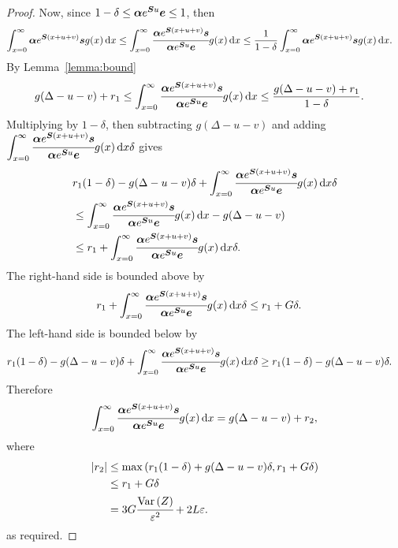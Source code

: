 \begin{proof}
	Now, since \(1-\delta\leq\boldsymbol \alpha e^{\boldsymbol Su}\boldsymbol e\leq 1\), then
	\begin{align*}
		\int_{x=0}^\infty \boldsymbol \alpha  e^{\boldsymbol{S} (x+u+v)} \boldsymbol s g(x)\, \mathrm{d} x
		\leq \int_{x=0}^\infty \cfrac{\boldsymbol \alpha  e^{\boldsymbol{S} (x+u+v)} \boldsymbol s}{\boldsymbol \alpha  e^{\boldsymbol{S} u} \boldsymbol e} g(x)\, \mathrm{d} x
		&\leq \frac{1}{1-\delta }\int_{x=0}^\infty \boldsymbol \alpha  e^{\boldsymbol{S} (x+u+v)} \boldsymbol s g(x)\, \mathrm{d} x.
	\end{align*}
	By Lemma~\ref{lemma:bound}  
	\begin{align*}
		g(\Delta-u-v)+r _1
		&\leq \int_{x=0}^\infty \cfrac{\boldsymbol \alpha  e^{\boldsymbol{S} (x+u+v)} \boldsymbol s}{\boldsymbol \alpha  e^{\boldsymbol{S} u} \boldsymbol e} g(x)\, \mathrm{d} x
		\leq \frac{g(\Delta-u-v)+r _1}{1-\delta }. 
	\end{align*}
	Multiplying by \(1-\delta \), then subtracting \(g(\Delta-u-v)\) and adding \(\displaystyle\int_{x=0}^\infty \cfrac{\boldsymbol \alpha  e^{\boldsymbol{S} (x+u+v)} \boldsymbol s}{\boldsymbol \alpha  e^{\boldsymbol{S} u} \boldsymbol e} g(x)\, \mathrm{d} x\delta \) gives
	\begin{align*}
		&r _1(1-\delta ) - g(\Delta-u-v)\delta +\int_{x=0}^\infty \cfrac{\boldsymbol \alpha  e^{\boldsymbol{S} (x+u+v)} \boldsymbol s}{\boldsymbol \alpha  e^{\boldsymbol{S} u} \boldsymbol e} g(x)\, \mathrm{d} x\delta 
		\\&\leq \int_{x=0}^\infty \cfrac{\boldsymbol \alpha  e^{\boldsymbol{S} (x+u+v)} \boldsymbol s}{\boldsymbol \alpha  e^{\boldsymbol{S} u} \boldsymbol e} g(x)\, \mathrm{d} x -g(\Delta-u-v)
		\\&\leq r _1+\int_{x=0}^\infty \cfrac{\boldsymbol \alpha  e^{\boldsymbol{S} (x+u+v)} \boldsymbol s}{\boldsymbol \alpha  e^{\boldsymbol{S} u} \boldsymbol e} g(x)\, \mathrm{d} x\delta .
	\end{align*}
	The right-hand side is bounded above by 
	\begin{align*}
		r _1+\int_{x=0}^\infty \cfrac{\boldsymbol \alpha  e^{\boldsymbol{S} (x+u+v)} \boldsymbol s}{\boldsymbol \alpha  e^{\boldsymbol{S} u} \boldsymbol e} g(x)\, \mathrm{d} x\delta 
		&\leq r _1 + G \delta .
	\end{align*}
	The left-hand side is bounded below by 
	\begin{align*}
		r_1 (1-\delta ) - g(\Delta-u-v)\delta +\int_{x=0}^\infty \cfrac{\boldsymbol \alpha  e^{\boldsymbol{S} (x+u+v)} \boldsymbol s}{\boldsymbol \alpha  e^{\boldsymbol{S} u} \boldsymbol e} g(x)\, \mathrm{d} x\delta 
		&\geq r _1(1-\delta ) - g(\Delta-u-v)\delta .
	\end{align*}
	Therefore 
	\begin{align}
		\int_{x=0}^\infty \cfrac{\boldsymbol \alpha  e^{\boldsymbol{S} (x+u+v)} \boldsymbol s}{\boldsymbol \alpha  e^{\boldsymbol{S} u} \boldsymbol e} g(x)\, \mathrm{d} x  = g(\Delta-u-v) + r_2 ,
	\end{align}
	where 
	\begin{align}
		\nonumber\left|r_2 \right| 
		&\leq \max\left(r _1(1-\delta ) + g(\Delta-u-v)\delta , r _1 + G \delta \right) 
		\\\nonumber&\leq  r_1 + G\delta
		\\&=3G\cfrac{\mathrm{Var} \left(Z \right)}{\varepsilon^2} + 2L\varepsilon .
	\end{align}
	as required. 
	

\end{proof}
